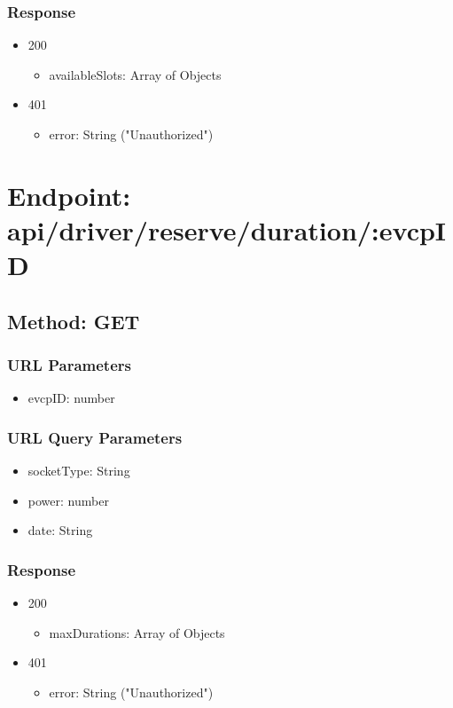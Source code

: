 \subsubsection*{Response}
\begin{itemize}
    \item 200
          \begin{itemize}
              \item availableSlots: Array of Objects
          \end{itemize}
    \item 401
          \begin{itemize}
              \item error: String ("Unauthorized")
          \end{itemize}
\end{itemize}

\section*{Endpoint: api/driver/reserve/duration/:evcpID}
\subsection*{Method: GET}
\subsubsection*{URL Parameters}
\begin{itemize}
    \item evcpID: number
\end{itemize}
\subsubsection*{URL Query Parameters}
\begin{itemize}
    \item socketType: String
    \item power: number
    \item date: String
\end{itemize}
\subsubsection*{Response}
\begin{itemize}
    \item 200
          \begin{itemize}
              \item maxDurations: Array of Objects
          \end{itemize}
    \item 401
          \begin{itemize}
              \item error: String ("Unauthorized")
          \end{itemize}
\end{itemize}

